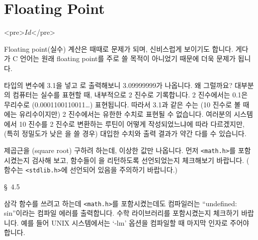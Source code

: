 \chapter{Floating Point}	\label{chap:float}

\begin{rawhtml}
<pre>$Id$</pre>
\end{rawhtml}

Floating point(실수) 계산은 때때로 문제가 되며, 신비스럽게 보이기도 합니다.
게다가 C 언어는 원래 floating point를 주로 쓸 목적이 아니었기 때문에 더욱
문제가 됩니다.


\begin{faq}
	 타입의 변수에 3.1을 넣고 로 출력해보니
	3.09999999가 나옵니다.  왜 그럴까요?
\A
	대부분의 컴퓨터는 실수를 표현할 때, 내부적으로 2 진수로 기록합니다.
	2 진수에서는 0.1은 무리수로 (0.0001100110011\ldots)
	표현됩니다.  따라서 3.1과 같은 수는 (10 진수로 볼 때에는 유리수이지만)
	2 진수에서는 유한한 수치로 표현될 수 없습니다.  여러분의 시스템에서
	10 진수를 2 진수로 변환하는 루틴이 어떻게 작성되었느냐에 따라
	다르겠지만, (특히 정밀도가 낮은 을 쓸 경우) 대입한 수치와
	출력 결과가 약간 다를 수 있습니다.  
\end{faq}

\begin{faq}
	제곱근을 (square root) 구하려 하는데, 이상한 값만 나옵니다.
\A
	먼저 \verb+<math.h>+를 포함시켰는지 검사해 보고, 함수들이
	을 리턴하도록 선언되었는지 체크해보기 바랍니다.
	( 함수는 \verb+<stdlib.h>+에 선언되어 있음을 주의하기
	바랍니다.) 

\R
	\cite{ctp} \S\ 4.5 
\end{faq}

\begin{faq}
	삼각 함수를 쓰려고 하는데 \verb+<math.h>+를 포함시켰는데도
	컴파일러는 ``undefined: sin''이라는 컴파일 에러를 출력합니다.
\A
	수학 라이브러리를 포함시켰는지 체크하기 바랍니다.
	예를 들어 UNIX 시스템에서는 `-lm' 옵션을 컴파일할 때 마지막 인자로
	주어야 합니다.  
\end{faq}

